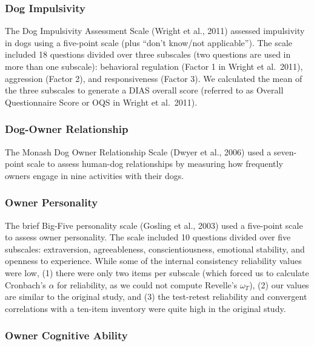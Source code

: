 \documentclass[
  pub,floatsintext]{apa6}
\begin{document}
\hypertarget{dog-impulsivity}{%
\subsubsection{Dog Impulsivity}\label{dog-impulsivity}}

The Dog Impulsivity Assessment Scale (Wright et al., 2011) assessed impulsivity in dogs using a five-point scale (plus ``don't know/not applicable''). The scale included 18 questions divided over three subscales (two questions are used in more than one subscale): behavioral regulation (Factor 1 in Wright et al.~2011), aggression (Factor 2), and responsiveness (Factor 3). We calculated the mean of the three subscales to generate a DIAS overall score (referred to as Overall Questionnaire Score or OQS in Wright et al.~2011).

\hypertarget{dog-owner-relationship}{%
\subsubsection{Dog-Owner Relationship}\label{dog-owner-relationship}}

The Monash Dog Owner Relationship Scale (Dwyer et al., 2006) used a seven-point scale to assess human-dog relationships by measuring how frequently owners engage in nine activities with their dogs.

\hypertarget{owner-personality}{%
\subsubsection{Owner Personality}\label{owner-personality}}

The brief Big-Five personality scale (Gosling et al., 2003) used a five-point scale to assess owner personality. The scale included 10 questions divided over five subscales: extraversion, agreeableness, conscientiousness, emotional stability, and openness to experience. While some of the internal consistency reliability values were low, (1) there were only two items per subscale (which forced us to calculate Cronbach's \(\alpha\) for reliability, as we could not compute Revelle's \(\omega_{T}\)), (2) our values are similar to the original study, and (3) the test-retest reliability and convergent correlations with a ten-item inventory were quite high in the original study.

\hypertarget{owner-cognitive-ability}{%
\subsubsection{Owner Cognitive Ability}\label{owner-cognitive-ability}}
\end{document}
